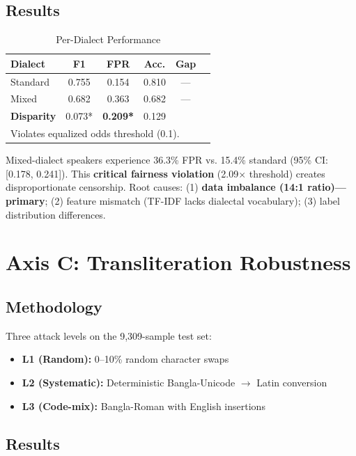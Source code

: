 \documentclass[conference]{IEEEtran}
\begin{document}
\subsection{Results}

\begin{table}[h]
\centering
\caption{Per-Dialect Performance}
\label{tab:axisB}
\begin{tabular}{lccccc}
\toprule
\textbf{Dialect} & \textbf{F1} & \textbf{FPR} & \textbf{Acc.} & \textbf{Gap} \\
\midrule
Standard & 0.755 & 0.154 & 0.810 & --- \\
Mixed & 0.682 & 0.363 & 0.682 & --- \\
\textbf{Disparity} & 0.073* & \textbf{0.209*} & 0.129 & \\
\bottomrule
\multicolumn{5}{l}{\small *Violates equalized odds threshold (0.1).} \\
\end{tabular}
\end{table}

Mixed-dialect speakers experience 36.3\% FPR vs. 15.4\% standard (95\% CI: [0.178, 0.241]). This \textbf{critical fairness violation} (2.09$\times$ threshold) creates disproportionate censorship. Root causes: (1) \textbf{data imbalance (14:1 ratio)---primary}; (2) feature mismatch (TF-IDF lacks dialectal vocabulary); (3) label distribution differences.

\section{Axis C: Transliteration Robustness}

\subsection{Methodology}

Three attack levels on the 9,309-sample test set:
\begin{itemize}
\item \textbf{L1 (Random):} 0--10\% random character swaps
\item \textbf{L2 (Systematic):} Deterministic Bangla-Unicode $\rightarrow$ Latin conversion
\item \textbf{L3 (Code-mix):} Bangla-Roman with English insertions
\end{itemize}

\subsection{Results}
\end{document}
